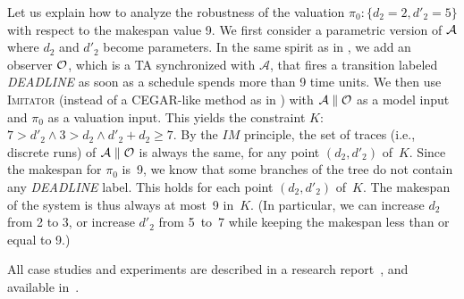 \documentclass{llncs}
\newcommand{\A}{\mathcal{A}}
\newcommand{\Ko}{K}
\newcommand{\pio}{\pi_0}
\newcommand{\IM}{\mathit{IM}}
\newcommand{\imitator}{\textsc{Imitator}}
\begin{document}
Let us explain how to analyze the robustness of the
valuation $\pio:\{d_2=2,d'_2=5\}$ with respect to the makespan value 9.
We first consider a parametric version of ${\cal A}$ where
$d_2$ and $d'_2$ become parameters.
In the same spirit as in \cite{cpr08},
we add an observer ${\cal O}$, which is a TA
synchronized with $\A$, that fires a transition labeled \textit{DEADLINE} as soon as a schedule spends more than 9 time units.
We then use \imitator{} (instead of a CEGAR-like method
as in \cite{cpr08}) with $\A \parallel {\cal O}$ as a model input
and $\pio$ as a valuation input.
This yields the constraint $\Ko$:  $7 > d'_2 \wedge 3 > d_2 \wedge d'_2 + d_2 \geq 7$.
By the $\IM$ principle, the set of traces (i.e., discrete runs) of
$\A \parallel {\cal O}$ is always the same,
for any point $(d_2,d'_2)$ of~$\Ko$.
Since the makespan for $\pio$ is~9,
we know that some branches of the tree do not contain
any \textit{DEADLINE} label. %
This holds for each point $(d_2,d'_2)$ of~$\Ko$.
The makespan of the system is thus always at most~9 in~$\Ko$. (In particular, we can increase $d_2$ from 2 to 3, or increase $d'_2$ from 5~to~7
while keeping the makespan less than or equal to 9.)




All case studies and experiments %
are described in a research report~\cite{soulat12}, and available in~\cite{imitator-web}. %
\end{document}

